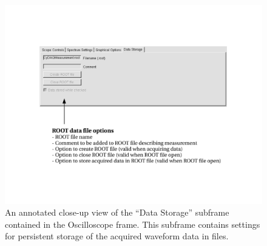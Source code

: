 \begin{figure}
  \centering
  \includegraphics[width=6in]{figures/OscilloscopeData}
  \caption{An annotated close-up view of the ``Data Storage'' subframe
    contained in the Oscilloscope frame. This subframe contains settings
    for persistent storage of the acquired waveform data in \ROOT
    files.}
  \label{fig:datasubframe}
\end{figure}

